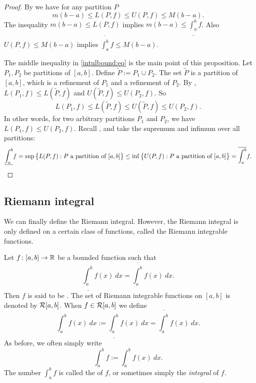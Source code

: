 \begin{proof}
By  we have for any partition $P$
\begin{equation*}
m(b-a) \leq L(P,f) \leq U(P,f) \leq M(b-a).
\end{equation*}
The inequality
$m(b-a) \leq L(P,f)$ implies $m(b-a) \leq \underline{\int_a^b} f$.
Also
$U(P,f) \leq M(b-a)$ implies $\overline{\int_a^b} f \leq M(b-a)$.

The middle inequality in
\eqref{intulbound:eq} is the main point of this proposition.
Let $P_1, P_2$ be partitions of $[a,b]$.  Define 
$\widetilde{P} := P_1 \cup P_2$.
The set $\widetilde{P}$ is a partition of $[a,b]$, which
is a refinement of $P_1$ and a refinement of $P_2$.
By ,
$L(P_1,f) \leq L(\widetilde{P},f)$ and
$U(\widetilde{P},f) \leq U(P_2,f)$.  So
\begin{equation*}
L(P_1,f) \leq L(\widetilde{P},f) \leq U(\widetilde{P},f) \leq U(P_2,f) .
\end{equation*}
In other words, for two arbitrary partitions $P_1$ and $P_2$, we have
$L(P_1,f) \leq U(P_2,f)$.  
Recall , and take the supremum and
infimum over all partitions:
\begin{equation*}
\underline{\int_a^b} f = 
\sup \, \bigl\{ L(P,f) : \text{$P$ a partition of $[a,b]$} \bigr\}
\leq
\inf \, \bigl\{ U(P,f) : \text{$P$ a partition of $[a,b]$} \bigr\}
=
\overline{\int_a^b} f . \qedhere
\end{equation*}
\end{proof}

\subsection{Riemann integral}

We can finally define the Riemann integral.  However, the Riemann
integral is only defined on a certain class of functions, called the
Riemann integrable functions.

\begin{defn}
Let $f \colon [a,b] \to {\mathbb{R}}$ be a bounded function such that
\begin{equation*}
\underline{\int_a^b} f(x)~dx = \overline{\int_a^b} f(x)~dx .
\end{equation*}
Then $f$ is said to be \emph{}.
The set of Riemann integrable functions on $[a,b]$ is denoted
by ${\mathcal{R}}[a,b]$.
When $f \in {\mathcal{R}}[a,b]$ we define
\begin{equation*}
\int_a^b f(x)~dx := 
\underline{\int_a^b} f(x)~dx = \overline{\int_a^b} f(x)~dx .
\end{equation*}
As before, we often simply write
\begin{equation*}
\int_a^b f := \int_a^b f(x)~dx.
\end{equation*}
The number $\int_a^b f$ is called the \emph{}
of $f$, or sometimes simply the \emph{integral} of $f$.
\end{defn}

